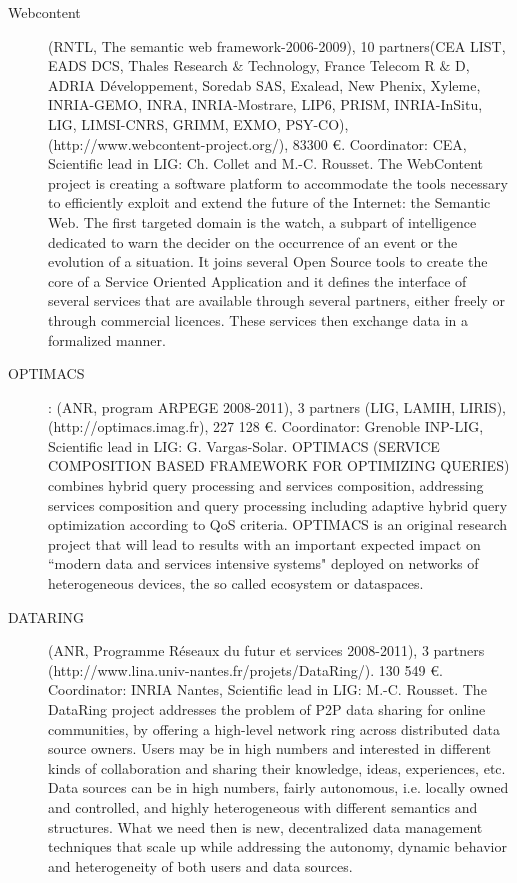\begin{description}

\item[Webcontent] (RNTL, The semantic web framework-2006-2009), 10 partners(CEA LIST, EADS DCS, Thales Research  $\&$ Technology, France Telecom R  $\&$ D, ADRIA D{\'e}veloppement, Soredab SAS, Exalead, New Phenix, Xyleme, INRIA-GEMO, INRA, INRIA-Mostrare, LIP6, PRISM, INRIA-InSitu, LIG, LIMSI-CNRS, GRIMM, EXMO, PSY-CO), \\
(http://www.webcontent-project.org/), 83300 \euro. Coordinator: CEA, Scientific lead in LIG: Ch. Collet and M.-C. Rousset. 
The WebContent project is creating a software platform to accommodate the tools necessary to efficiently exploit and extend the future of the Internet: the Semantic Web. The first targeted domain is the watch, a subpart of intelligence dedicated to warn the decider on the occurrence of an event or the evolution of a situation. It joins several Open Source tools to create the core of a Service Oriented Application and it defines the interface of several services that are available through several partners, either freely or through commercial licences. These services then exchange data in a formalized manner.


\item[OPTIMACS]: (ANR, program ARPEGE 2008-2011), 3 partners (LIG, LAMIH, LIRIS),  (http://optimacs.imag.fr), 227 128 \euro. Coordinator: Grenoble INP-LIG, Scientific lead in LIG: G. Vargas-Solar. 
OPTIMACS (SERVICE COMPOSITION BASED FRAMEWORK FOR OPTIMIZING QUERIES) combines hybrid query processing and services composition, addressing services composition and query processing including adaptive hybrid query optimization according to QoS criteria. OPTIMACS is an original research project that will lead to results with an important expected impact on ``modern data and services intensive systems" deployed on networks of heterogeneous devices, the so called ecosystem or dataspaces.

\item[DATARING] (ANR, Programme R{\'e}seaux du futur et services 2008-2011), 3 partners (http://www.lina.univ-nantes.fr/projets/DataRing/). 130 549 \euro. Coordinator: INRIA Nantes, Scientific lead in LIG: M.-C. Rousset. 
The DataRing project addresses the problem of P2P data sharing for online communities, by offering a high-level network ring across distributed data source owners. Users may be in high numbers and interested in different kinds of collaboration and sharing their knowledge, ideas, experiences, etc. Data sources can be in high numbers, fairly autonomous, i.e. locally owned and controlled, and highly heterogeneous with different semantics and structures. What we need then is new, decentralized data management techniques that scale up while addressing the autonomy, dynamic behavior and heterogeneity of both users and data sources.


\end{description}
